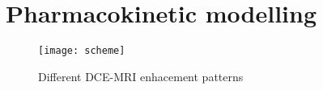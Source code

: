 \chapter{Pharmacokinetic modelling}
	

\begin{figure}
		\centering
		\texttt{[image: scheme]}
		\caption [DCE-MRI enhacement patterns]{Different DCE-MRI enhacement patterns \cite{khalifa2014models}}
		\label{fig:pk_draft}
	\end{figure}
